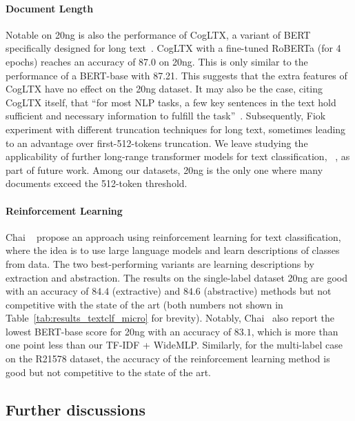 \paragraph{Document Length}
Notable on 20ng is also the performance of CogLTX, a variant of BERT specifically designed for long text~\cite{DBLP:conf/nips/DingZY020}.
CogLTX with a fine-tuned RoBERTa (for 4 epochs) reaches an accuracy of 87.0 on 20ng.
This is only similar to the performance of a BERT-base with 87.21.
This suggests that the extra features of CogLTX have no effect on the 20ng dataset.
It may also be the case, citing CogLTX itself, that 
``for most NLP tasks, a few key sentences in the text hold sufficient and necessary information to fulfill the task''~\cite{DBLP:conf/nips/DingZY020}.
Subsequently, Fiok~\etal~\cite{DBLP:journals/access/FiokKGDWAAZ21} experiment with different truncation techniques for long text, sometimes leading to an advantage over first-512-tokens truncation.
We leave studying the applicability of further long-range transformer models for text classification, \eg ~\cite{DBLP:journals/access/FiokKGDWAAZ21,DBLP:journals/corr/abs-2004-05150}, as part of future work. Among our datasets, 20ng is the only one where many documents exceed the 512-token threshold.

\paragraph{Reinforcement Learning}
Chai \etal~\cite{DBLP:conf/icml/ChaiWHWL20} propose an approach using reinforcement learning for text classification, where the idea is to use large language models and learn descriptions of classes from data.
The two best-performing variants are learning descriptions by extraction and abstraction.
The results on the single-label dataset 20ng are good with an accuracy of $84.4$ (extractive) and $84.6$ (abstractive) methods but not competitive with the state of the art (both numbers not shown in Table~\ref{tab:results_textclf_micro} for brevity).
Notably, Chai~\etal\cite{DBLP:conf/icml/ChaiWHWL20} also report the lowest BERT-base score for 20ng with an accuracy of $83.1$, which is more than one point less than our TF-IDF + WideMLP.
Similarly, for the multi-label case on the R21578 dataset, the accuracy of the reinforcement learning method is good but not competitive to the state of the art.

\subsection{Further discussions}

